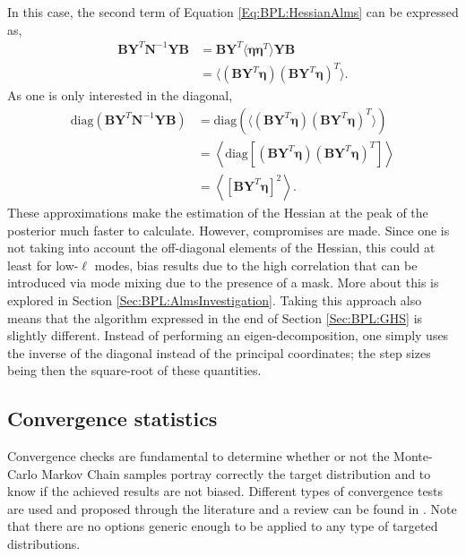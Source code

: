 \qquad In this case, the second term of Equation \ref{Eq:BPL:HessianAlms} can be expressed as,
\begin{align}
    \mathbf{B}\mathbf{Y}^T\mathbf{N}^{-1}\mathbf{Y}\mathbf{B} & = \mathbf{B}\mathbf{Y}^T\langle \bm{\eta} \bm{\eta}^T \rangle\mathbf{Y}\mathbf{B} \\
    & = \langle (\mathbf{B}\mathbf{Y}^T\bm{\eta}) (\mathbf{B}\mathbf{Y}^T\bm{\eta})^T \rangle.
\end{align}
As one is only interested in the diagonal,
\begin{align}
    \text{diag}\left(\mathbf{B}\mathbf{Y}^T\mathbf{N}^{-1}\mathbf{Y}\mathbf{B}\right) & = \text{diag}\left(\langle (\mathbf{B}\mathbf{Y}^T\bm{\eta}) (\mathbf{B}\mathbf{Y}^T\bm{\eta})^T \rangle\right) \\
    & = \left\langle \text{diag} \left[ (\mathbf{B}\mathbf{Y}^T\bm{\eta}) (\mathbf{B}\mathbf{Y}^T\bm{\eta})^T \right] \right\rangle \\
    & = \left\langle \left[\mathbf{B}\mathbf{Y}^T\bm{\eta} \right]^2 \right\rangle.
\end{align}
These approximations make the estimation of the Hessian at the peak of the posterior much faster to calculate. However, compromises are made. Since one is not taking into account the off-diagonal elements of the Hessian, this could at least for low-$\ell$ modes, bias results due to the high correlation that can be introduced via mode mixing due to the presence of a mask. More about this is explored in Section \ref{Sec:BPL:AlmsInvestigation}. Taking this approach also means that the algorithm expressed in the end of Section \ref{Sec:BPL:GHS} is slightly different. Instead of performing an eigen-decomposition, one simply uses the inverse of the diagonal instead of the principal coordinates; the step sizes being then the square-root of these quantities.

\subsection{Convergence statistics}\label{Sec:BPL:Convergence}
Convergence checks are fundamental to determine whether or not the Monte-Carlo Markov Chain samples portray correctly the target distribution and to know if the achieved results are not biased. Different types of convergence tests are used and proposed through the literature and a review can be found in \cite{2017Deonovic}. Note that there are no options generic enough to be applied to any type of targeted distributions.

